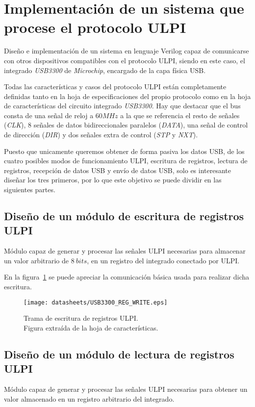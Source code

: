 \section{Implementación de un sistema que procese el protocolo ULPI}
Diseño e implementación de un sistema en lenguaje Verilog capaz de comunicarse con otros dispositivos compatibles con el protocolo ULPI, siendo en este caso, el integrado \emph{USB3300} de \emph{Microchip}, encargado de la capa física USB.

Todas las características y casos del protocolo ULPI están completamente definidas tanto en la hoja de especificaciones del propio protocolo\cite{ulpi-specs} como en la hoja de características del circuito integrado \emph{USB3300}\cite{microchip:usb3300}. Hay que destacar que el bus consta de una señal de reloj a $60MHz$ a la que se referencia el resto de señales (\emph{CLK}), 8 señales de datos bidireccionales paralelos (\emph{DATA}), una señal de control de dirección (\emph{DIR}) y dos señales extra de control (\emph{STP} y \emph{NXT}).

Puesto que unicamente queremos obtener de forma pasiva los datos USB, de los cuatro posibles modos de funcionamiento ULPI, escritura de registros, lectura de registros, recepción de datos USB y envío de datos USB, solo es interesante diseñar los tres primeros, por lo que este objetivo se puede dividir en las siguientes partes.

\subsection{Diseño de un módulo de escritura de registros ULPI}
Módulo capaz de generar y procesar las señales ULPI necesarias para almacenar un valor arbitrario de $8~bits$, en un registro del integrado conectado por ULPI.

En la figura~\ref{fig:ULPI_REG_WRITE} se puede apreciar la comunicación básica usada para realizar dicha escritura.
\begin{figure}[hbt]
    \centering
    \texttt{[image: datasheets/USB3300\_REG\_WRITE.eps]}
    \caption{Trama de escritura de registros ULPI. \\Figura extraída de la hoja de características.}
    \label{fig:ULPI_REG_WRITE}
\end{figure}

\subsection{Diseño de un módulo de lectura de registros ULPI}
Módulo capaz de generar y procesar las señales ULPI necesarias para obtener un valor almacenado en un registro arbitrario del integrado.

